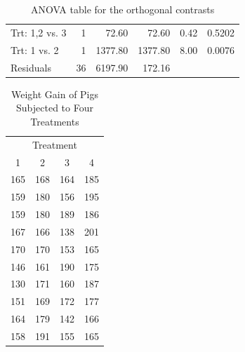 \documentclass[12pt]{article} %
\begin{document}
\begin{enumerate}
\begin{itemize}
\begin{itemize}
\begin{table}[ht]
\begin{center}
\begin{tabular}{lrrrrr}
    Trt: 1,2 vs. 3   & 1 & 72.60 & 72.60 & 0.42 & 0.5202 \\ 
    Trt: 1 vs. 2     & 1 & 1377.80 & 1377.80 & 8.00 & 0.0076 \\ 
  Residuals          & 36 & 6197.90 & 172.16 &  &  \\ 
   \hline
\end{tabular}
\caption{ANOVA table for the orthogonal contrasts}
\end{center}
\end{table}   		  \end{itemize}	       	 
 		\begin{table}[ht]
		\begin{center}
		\begin{tabular}{cccc}
		\hline 
		\multicolumn{4}{c}{Treatment}\\
		1 & 2 & 3 & 4 \\
		\hline
		165 & 168 & 164 & 185 \\		
		159 & 180 & 156 & 195 \\
		159 & 180 & 189 & 186 \\
		167 & 166 & 138 & 201 \\
		170 & 170 & 153 & 165 \\
		146 & 161 & 190 & 175 \\
		130 & 171 & 160 & 187 \\
		151 & 169 & 172 & 177 \\
		164 & 179 & 142 & 166 \\
		158 & 191 & 155 & 165 \\
		\hline
		\end{tabular}
		\caption{Weight Gain of Pigs Subjected to Four Treatments\label{pigtbl}}
		\end{center}
		\end{table}  	 
   	\end{itemize}
\end{enumerate}
\end{document}
